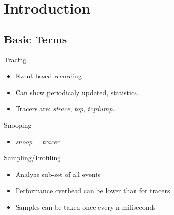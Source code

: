 \documentclass{beamer}
\begin{document}
\section{Introduction} %
\subsection{Basic Terms}

\begin{frame}
  \begin{block}{Tracing}
		\begin{LARGE}
			\begin{itemize}
				\item<+-> Event-based recording.  
				\item<+-> Can show periodicaly updated, statistics.
				\item<+-> Tracers are: \emph{strace}, \emph{top}, \emph{tcpdump}. 
			\end{itemize}
		\end{LARGE}
  \end{block}
\end{frame}


\begin{frame}
  \begin{block}{Snooping}
    \begin{itemize}
      \item \LARGE \emph{snoop = tracer}
    \end{itemize}
  \end{block}
\end{frame}


\begin{frame}
  \begin{block}{Sampling/Profiling}
		\begin{Large}
			\begin{itemize}
				\item<+-> Analyze sub-set of all events
				\item<+-> Performance overhead can be lower than for tracers
				\item<+-> Samples can be taken once every n miliseconds 
			\end{itemize}
		\end{Large}
  \end{block} 
\end{frame}
\end{document}
